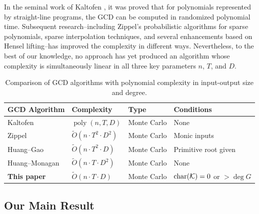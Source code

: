 \documentclass{article}
\numberwithin{equation}{section}
\begin{document}
In the seminal work of Kaltofen \cite{kaltofen1988,kaltofen1985}, it was proved that for polynomials represented by straight-line programs, the GCD can be computed in randomized polynomial time. %
Subsequent research--including Zippel’s probabilistic algorithms for sparse polynomials, sparse interpolation techniques, and several enhancements based on Hensel lifting--has improved the complexity in different ways. Nevertheless, to the best of our knowledge, no approach has yet produced an algorithm whose complexity is simultaneously linear in all three key parameters $n$, $T$, and $D$.
\begin{table}[ht]
    \centering
    \begin{tabular}{llll}
\toprule
\textbf{GCD Algorithm} & \textbf{Complexity} & \textbf{Type} & \textbf{Conditions} \\
\midrule
Kaltofen \cite{kaltofen1988,kaltofen1985} & $\operatorname{poly}(n,T,D)$ & Monte Carlo & None \\
Zippel \cite{zippel1979} & $\widetilde{O}(n \cdot T^2 \cdot D^2)$ & Monte Carlo & Monic inputs \\
Huang--Gao \cite{HuangGao2025} & $\widetilde{O}(n \cdot T^2 \cdot D)$ & Monte Carlo & Primitive root given \\
Huang--Monagan \cite{HuangMonagan2024} & $\widetilde{O}(n \cdot T \cdot D^2)$ & Monte Carlo & None \\
\textbf{This paper} & $\widetilde{O}(n \cdot T \cdot D)$ & Monte Carlo & $\operatorname{char}({\mathcal{K}})=0$ or $>\deg G$ \\
\bottomrule
\end{tabular}
    \caption{Comparison of GCD algorithms with polynomial complexity in input-output size and degree.}
    \label{tab:comparison}
\end{table}




\subsection{Our Main Result}
\end{document}
